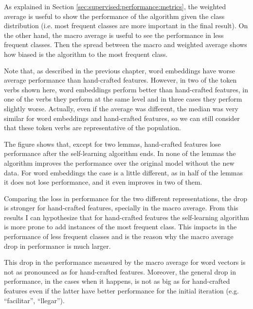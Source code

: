As explained in Section \ref{sec:supervised:performance:metrics}, the weighted
average is useful to show the performance of the algorithm given the class
distribution (i.e. most frequent classes are more important in the final
result). On the other hand, the macro average is useful to see the performance
in less frequent classes. Then the spread between the macro and weighted
average shows how biased is the algorithm to the most frequent class.

Note that, as described in the previous chapter, word embeddings have worse
average performance than hand-crafted features. However, in two of the token
verbs shown here, word embeddings perform better than hand-crafted features, in
one of the verbs they perform at the same level and in three cases they perform
slightly worse. Actually, even if the average was different, the median was
very similar for word embeddings and hand-crafted features, so we can still
consider that these token verbs are representative of the population.

The figure shows that, except for two lemmas, hand-crafted features lose
performance after the self-learning algorithm ends. In none of the lemmas the
algorithm improves the performance over the original model without the new
data. For word embeddings the case is a little different, as in half of the
lemmas it does not lose performance, and it even improves in two of them. 

Comparing the loss in performance for the two different representations, the
drop is stronger for hand-crafted features, specially in the macro average.
From this results I can hypothesize that for hand-crafted features the
self-learning algorithm is more prone to add instances of the most frequent
class. This impacts in the performance of less frequent classes and is the
reason why the macro average drop in performance is much larger.

This drop in the performance measured by the macro average for word vectors is
not as pronounced as for hand-crafted features. Moreover, the general drop in
performance, in the cases when it happens, is not as big as for hand-crafted
features even if the latter have better performance for the initial iteration
(e.g. ``facilitar'', ``llegar'').

